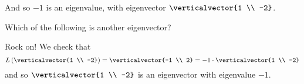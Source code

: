 \documentclass{ximera}
\begin{document}
\begin{question}
\begin{solution}
\begin{hint}
\begin{question}
        And so $-1$ is an eigenvalue, with eigenvector $\verticalvector{1 \\ -2}$.
      \end{question}
    \end{hint}

    Which of the following is another eigenvector?
    \begin{multiple-choice}
    \end{multiple-choice}
  \end{solution}

  Rock on!  We check that 
  $$
  L\left( \verticalvector{1 \\ -2} \right) = \verticalvector{-1 \\ 2} = -1 \cdot \verticalvector{1 \\ -2}
  $$
  and so $\verticalvector{1 \\ -2}$ is an eigenvector with eigenvalue $-1$.
\end{question}
\end{document}
